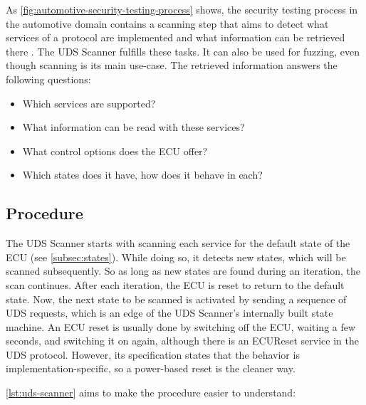 As \autoref{fig:automotive-security-testing-process} shows, the security testing process in the automotive domain contains a scanning step that aims to detect what services of a protocol are implemented and what information can be retrieved there \cite{Bayer2015}. The UDS Scanner fulfills these tasks. It can also be used for fuzzing, even though scanning is its main use-case. The retrieved information answers the following questions:

\begin{itemize}
\item Which services are supported?
\item What information can be read with these services?
\item What control options does the ECU offer?
\item Which states does it have, how does it behave in each?
\end{itemize}


\subsection{Procedure}

The UDS Scanner starts with scanning each service for the default state of the ECU (see \autoref{subsec:states}). While doing so, it detects new states, which will be scanned subsequently. So as long as new states are found during an iteration, the scan continues. After each iteration, the ECU is reset to return to the default state. Now, the next state to be scanned is activated by sending a sequence of UDS requests, which is an edge of the UDS Scanner's internally built state machine. An ECU reset is usually done by switching off the ECU, waiting a few seconds, and switching it on again, although there is an ECUReset service in the UDS protocol. However, its specification states that the behavior is implementation-specific, so a power-based reset is the cleaner way.

\autoref{lst:uds-scanner} aims to make the procedure easier to understand:

